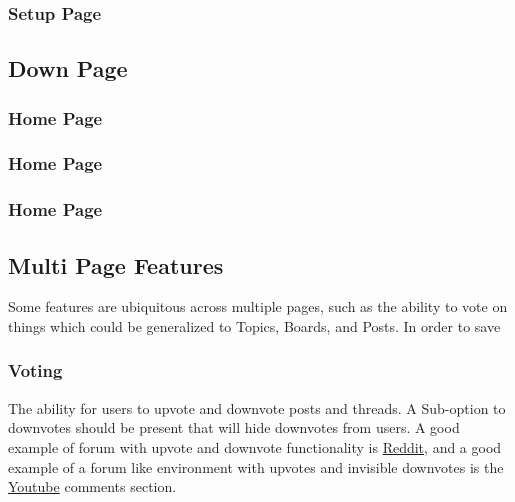 \documentclass[]{article}
\begin{document}
\subsubsection{Setup Page}

\subsection{Down Page}

\subsubsection{Home Page}

\subsubsection{Home Page}

\subsubsection{Home Page}



\subsection{Multi Page Features}
Some features are ubiquitous across multiple pages, such as the ability to vote on things which could be generalized to Topics, Boards, and Posts. In order to save

\subsubsection{Voting}
The ability for users to upvote and downvote posts and threads. A Sub-option to downvotes should be present that will hide downvotes from users. 
A good example of forum with upvote and downvote functionality is \href{https://www.reddit.com/}{Reddit}, and a good example of a forum like environment with upvotes and invisible downvotes is the \href{https://www.youtube.com/}{Youtube} comments section. 

\\
\end{document}
